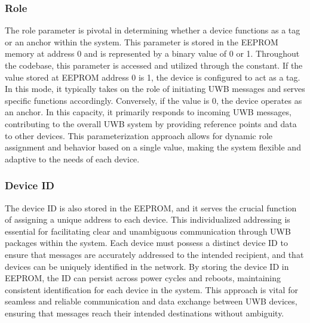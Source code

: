 \subsubsection{Role}
The role parameter is pivotal in determining whether a device functions as a tag or an anchor within the system. 
This parameter is stored in the EEPROM memory at address 0 and is represented by a binary value of 0 or 1. 
Throughout the codebase, this parameter is accessed and utilized through the  constant.
\vspace{4pt}
\newline
If the value stored at EEPROM address 0 is 1, the device is configured to act as a tag. 
In this mode, it typically takes on the role of initiating UWB messages and serves specific functions accordingly. Conversely, if the value is 0, the device operates as an anchor. 
In this capacity, it primarily responds to incoming UWB messages, contributing to the overall UWB system by providing reference points and data to other devices.
\vspace{4pt}
\newline
This parameterization approach allows for dynamic role assignment and behavior based on a single value, making the system flexible and adaptive to the needs of each device.

\subsubsection{Device ID}
The device ID is also stored in the EEPROM, and it serves the crucial function of assigning a unique address to each device. 
This individualized addressing is essential for facilitating clear and unambiguous communication through UWB packages within the system. 
Each device must possess a distinct device ID to ensure that messages are accurately addressed to the intended recipient, and that devices can be uniquely identified in the network.
\vspace{4pt}
\newline
By storing the device ID in EEPROM, the ID can persist across power cycles and reboots, maintaining consistent identification for each device in the system. 
This approach is vital for seamless and reliable communication and data exchange between UWB devices, ensuring that messages reach their intended destinations without ambiguity.

